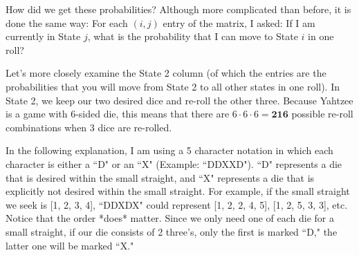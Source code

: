 \documentclass[12pt,a4paper]{article}
\begin{document}
\begin{flushleft}
    How did we get these probabilities? Although more complicated than before, it is done the same way: For each $(i, j)$ entry of the matrix, I asked: If I am currently in State $j$, what is the probability that I can move to State $i$ in one roll?

    Let's more closely examine the State 2 column (of which the entries are the probabilities that you will move from State 2 to all other states in one roll). In State 2, we keep our two desired dice and re-roll the other three. Because Yahtzee is a game with 6-sided die, this means that there are $6 \cdot 6 \cdot 6 = \textbf{216}$ possible re-roll combinations when 3 dice are re-rolled.

    In the following explanation, I am using a 5 character notation in which each character is either a ``D" or an ``X" (Example: ``DDXXD"). ``D" represents a die that is desired within the small straight, and ``X" represents a die that is explicitly not desired within the small straight. For example, if the small straight we seek is [1, 2, 3, 4], ``DDXDX" could represent [1, 2, 2, 4, 5], [1, 2, 5, 3, 3], etc. Notice that the order *does* matter. Since we only need one of each die for a small straight, if our die consists of 2 three's, only the first is marked ``D," the latter one will be marked ``X."
\end{flushleft}
\end{document}
